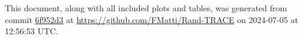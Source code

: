 This document, along with all included plots and tables, was generated from commit \href{https://github.com/FMatti/Rand-TRACE/tree/6f952d3}{6f952d3} at \url{https://github.com/FMatti/Rand-TRACE} on 2024-07-05 at 12:56:53 UTC.
